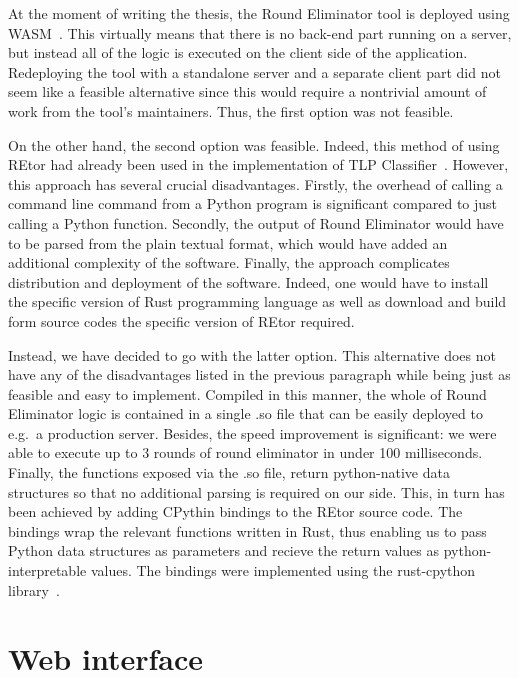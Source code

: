 At the moment of writing the thesis, the Round Eliminator tool
is deployed using WASM~\cite{WASM}. This virtually means that
there is no back-end part running on a server, but instead
all of the logic is executed on the client side of the application.
Redeploying the tool with a standalone server and a separate client
part did not seem like a feasible alternative since this would
require a nontrivial amount of work from the tool's maintainers.
Thus, the first option was not feasible.

On the other hand, the second option was feasible. Indeed,
this method of using REtor had already been used in the
implementation of TLP Classifier~\cite{Rocher2020clas}. However,
this approach has several crucial disadvantages.
Firstly, the overhead of calling a command line command
from a Python program is significant compared to just calling
a Python function. Secondly, the output of Round Eliminator
would have to be parsed from the plain textual format, which
would have added an additional complexity of the software.
Finally, the approach complicates distribution and deployment of
the software. Indeed, one would have to install the specific
version of Rust programming language as well as download and
build form source codes the specific version of REtor required.

Instead, we have decided to go with the latter option. This
alternative does not have any of the disadvantages listed
in the previous paragraph while being just as feasible and
easy to implement. Compiled in this manner, the whole of
Round Eliminator logic is contained in a single .so file
that can be easily deployed to e.g.\ a production server.
Besides, the speed improvement is significant: we were
able to execute up to 3 rounds of round eliminator
in under 100 milliseconds. Finally, the functions
exposed via the .so file, return python-native
data structures so that no additional parsing is required on our side.
This, in turn has been achieved by adding CPythin bindings
to the REtor source code. The bindings wrap the relevant functions
written in Rust, thus enabling us to pass Python data structures
as parameters and recieve the return values as python-interpretable values.
The bindings were implemented using the rust-cpython library~\cite{RustCPython}.


\section{Web interface}
\label{section:webinterface}

